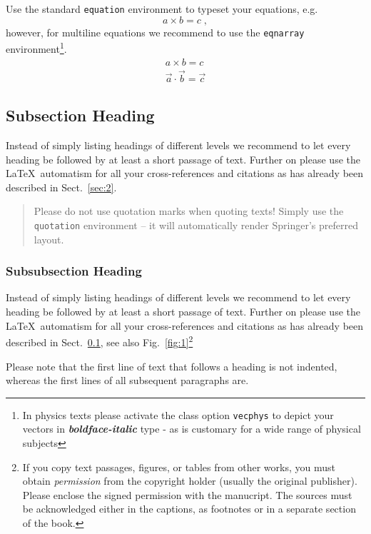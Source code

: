 \documentclass[graybox]{svmult}
\begin{document}
Use the standard \verb|equation| environment to typeset your equations, e.g.
%
\begin{equation}
a \times b = c\;,
\end{equation}
%
however, for multiline equations we recommend to use the \verb|eqnarray| environment\footnote{In physics texts please activate the class option \texttt{vecphys} to depict your vectors in \textbf{\itshape boldface-italic} type - as is customary for a wide range of physical subjects}.
\begin{eqnarray}
a \times b = c \nonumber\\
\vec{a} \cdot \vec{b}=\vec{c}
\label{eq:01}
\end{eqnarray}

\subsection{Subsection Heading}
\label{subsec:2}
Instead of simply listing headings of different levels we recommend to
let every heading be followed by at least a short passage of text.
Further on please use the \LaTeX\ automatism for all your
cross-references and citations
as has already been described in Sect.~\ref{sec:2}.

\begin{quotation}
Please do not use quotation marks when quoting texts! Simply use the \verb|quotation| environment -- it will automatically render Springer's preferred layout.
\end{quotation}


\subsubsection{Subsubsection Heading}
Instead of simply listing headings of different levels we recommend to
let every heading be followed by at least a short passage of text.
Further on please use the \LaTeX\ automatism for all your
cross-references and citations as has already been described in
Sect.~\ref{subsec:2}, see also Fig.~\ref{fig:1}\footnote{If you copy
text passages, figures, or tables from other works, you must obtain
\textit{permission} from the copyright holder (usually the original
publisher). Please enclose the signed permission with the manucript. The
sources must be acknowledged either in the
captions, as footnotes or in a separate section of the book.}

Please note that the first line of text that follows a heading is not indented, whereas the first lines of all subsequent paragraphs are.
\end{document}

